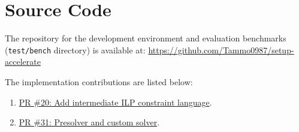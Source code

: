 \appendix
\section{Source Code}
\label{app:source-code}

The repository for the development environment and evaluation benchmarks (\texttt{test/bench} directory) is available at: \url{https://github.com/Tammo0987/setup-accelerate}

The implementation contributions are listed below:
\begin{enumerate}
    \item \href{https://github.com/ivogabe/accelerate/pull/20}{PR \#20: Add intermediate ILP constraint language}.
    \item \href{https://github.com/ivogabe/accelerate/pull/31}{PR \#31: Presolver and custom solver}.
\end{enumerate}

